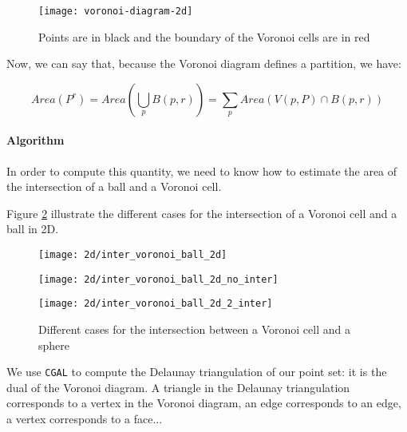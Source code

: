 \begin{figure}[h]
    \centering
    \texttt{[image: voronoi-diagram-2d]}
    \caption{Points are in black and the boundary of the Voronoi cells are in
        red}
    \label{fig:voronoi-diagram-2d}
\end{figure}

Now, we can say that, because the Voronoi diagram defines a partition, we have:

\begin{equation}
    Area(P^r) = Area \left( \bigcup_p B(p, r) \right) = \sum_p Area(V(p, P) \cap B(p, r))
    \label{eqn:area-union-balls}
\end{equation}

\paragraph{Algorithm}

In order to compute this quantity, we need to know how to estimate the area of the
intersection of a ball and a Voronoi cell.

Figure \ref{fig:inter_voronoi_ball_2d} illustrate the different cases for
the intersection of a Voronoi cell and a ball in 2D.

\begin{figure}[h]
    \centering
    \begin{minipage}{0.32\linewidth}
        \centering
        \texttt{[image: 2d/inter\_voronoi\_ball\_2d]}
        \label{fig:inter_voronoi_ball_2d:a}
    \end{minipage}
    \begin{minipage}{0.32\linewidth}
        \centering
        \texttt{[image: 2d/inter\_voronoi\_ball\_2d\_no\_inter]}
        \label{fig:inter_voronoi_ball_2d:b}
    \end{minipage}
    \begin{minipage}{0.32\linewidth}
        \centering
        \texttt{[image: 2d/inter\_voronoi\_ball\_2d\_2\_inter]}
        \label{fig:inter_voronoi_ball_2d:c}
    \end{minipage}

   \caption{Different cases for the intersection between a Voronoi cell and a sphere}
   \label{fig:inter_voronoi_ball_2d}
\end{figure}

We use \texttt{CGAL} to compute the Delaunay triangulation of our point set: it
is the dual of the Voronoi diagram. A triangle in the Delaunay
triangulation corresponds to a vertex in the Voronoi diagram, an edge
corresponds to an edge, a vertex corresponds to a face...

